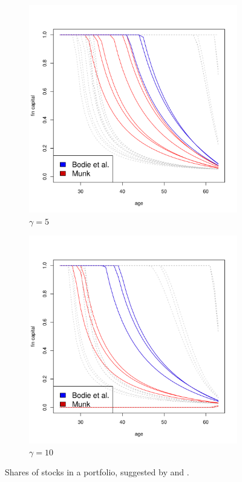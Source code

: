 \begin{figure}[H]\ContinuedFloat
    \begin{subfigure}{0.45\textwidth}
		\centering
		\includegraphics[scale=0.3]{figs/individuals5.pdf}
		\caption{$\gamma = 5$}
	\end{subfigure}
	\hfill
    \begin{subfigure}{0.45\textwidth}
		\centering
		\includegraphics[scale=0.3]{figs/individuals10.pdf}
		\caption{$\gamma = 10$}
	\end{subfigure}
	\caption{Shares of stocks in a portfolio, suggested by \citet{bodie} and \citet{munk}.}
	\label{fig:individs}
\end{figure}


